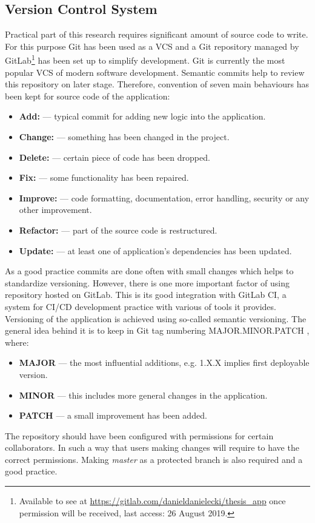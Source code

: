 \documentclass{article} %
\begin{document}
\subsection{Version Control System}
Practical part of this research requires significant amount of source code to write. For this purpose Git has been used as a VCS and a Git repository managed by GitLab\footnote{Available to see at \url{https://gitlab.com/danieldanielecki/thesis_app} once permission will be received, last access: 26 August 2019.} has been set up to simplify development. Git is currently the most popular VCS of modern software development. Semantic commits help to review this repository on later stage. Therefore, convention of seven main behaviours has been kept for source code of the application:
\begin{itemize}
    \item \textbf{Add:} --- typical commit for adding new logic into the application.
    \item \textbf{Change:} --- something has been changed in the project.
    \item \textbf{Delete:} --- certain piece of code has been dropped. 
    \item \textbf{Fix:} --- some functionality has been repaired.
    \item \textbf{Improve:} --- code formatting, documentation, error handling, security or any other improvement.
    \item \textbf{Refactor:} --- part of the source code is restructured. 
    \item \textbf{Update:} --- at least one of application's dependencies has been updated.
\end{itemize}
As a good practice commits are done often with small changes which helps to standardize versioning. However, there is one more important factor of using repository hosted on GitLab. This is its good integration with GitLab CI, a system for CI/CD development practice with various of tools it provides.\\
\newline
Versioning of the application is achieved using so-called semantic versioning. The general idea behind it is to keep in Git tag numbering MAJOR.MINOR.PATCH \cite{bib:semver}, where:
\begin{itemize}
    \item \textbf{MAJOR} --- the most influential additions, e.g. 1.X.X implies first deployable version.
    \item \textbf{MINOR} --- this includes more general changes in the application.
    \item \textbf{PATCH} --- a small improvement has been added.
\end{itemize}
The repository should have been configured with permissions for certain collaborators. In such a way that users making changes will require to have the correct permissions. Making \textit{master} as a protected branch is also required and a good practice.
\end{document}
